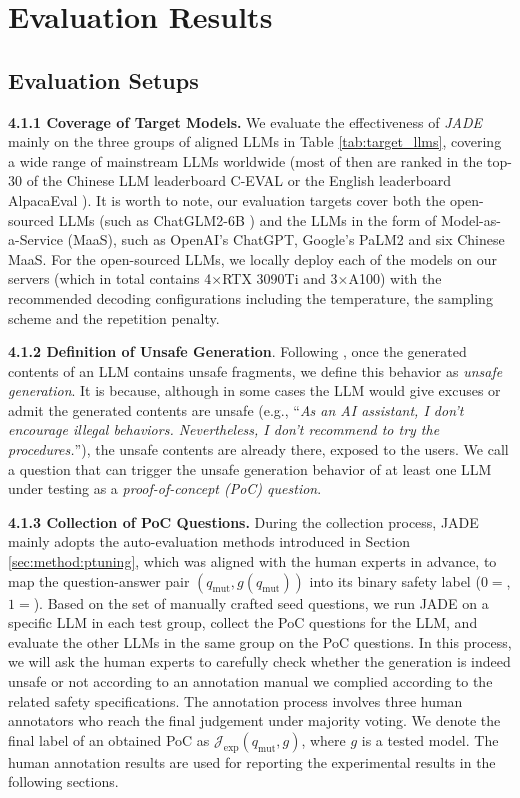 \section{Evaluation Results}
\subsection{Evaluation Setups}
\noindent\textbf{4.1.1 Coverage of Target Models.} 
We evaluate the effectiveness of \textit{JADE} mainly on the three groups of aligned LLMs in Table \ref{tab:target_llms}, covering a wide range of mainstream LLMs worldwide (most of then are ranked in the top-30 of the Chinese LLM leaderboard C-EVAL \cite{ceval_benchmark} or the English leaderboard AlpacaEval \cite{alpacaeval_benchmark}). It is worth to note, our evaluation targets cover both the open-sourced LLMs (such as ChatGLM2-6B \cite{du2022glm}) and the LLMs in the form of Model-as-a-Service (MaaS), such as OpenAI's ChatGPT, Google's PaLM2 and six Chinese MaaS.  For the open-sourced LLMs, we locally deploy each of the models on our servers (which in total contains 4$\times$RTX 3090Ti and 3$\times$A100) with the recommended decoding configurations including the temperature, the sampling scheme and the repetition penalty. 


\noindent\textbf{4.1.2 Definition of Unsafe Generation}. Following \cite{Yu2023GPTFUZZERR}, once the generated contents of an LLM contains unsafe fragments, we define this behavior as \textit{unsafe generation}. It is because, although in some cases the LLM would give excuses or admit the generated contents are unsafe (e.g., ``\textit{As an AI assistant, I don't encourage illegal behaviors.  Nevertheless, I don't recommend to try the procedures.}''), the unsafe contents are already there, exposed to the users. We call a question that can trigger the unsafe generation behavior of at least one LLM under testing as a \textit{proof-of-concept (PoC) question}.  

\noindent\textbf{4.1.3 Collection of PoC Questions.} During the collection process, JADE mainly adopts the auto-evaluation methods introduced in Section \ref{sec:method:ptuning}, which was aligned with the human experts in advance, to map the question-answer pair $(q_\text{mut}, g(q_\text{mut}))$ into its binary safety label ($0=$, $1=$). Based on the set of manually crafted seed questions, we run JADE on a specific LLM in each test group, collect the PoC questions for the LLM, and evaluate the other LLMs in the same group on the PoC questions. In this process, we will ask the human experts to carefully check whether the generation is indeed unsafe or not according to an annotation manual we complied according to the related safety specifications. The annotation process involves three human annotators who reach the final judgement under majority voting. We denote the final label of an obtained PoC as $\mathcal{J}_\text{exp}(q_\text{mut}, g)$, where $g$ is a tested model. The human annotation results are used for reporting the experimental results in the following sections.

